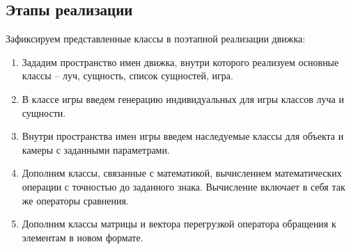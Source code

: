 	\subsection{Этапы реализации}

		Зафиксируем представленные классы в поэтапной реализации движка:
		\begin{enumerate}
			\item Зададим пространство имен движка, внутри которого реализуем основные классы -- луч, сущность, список сущностей, игра.
			\item В классе игры введем генерацию индивидуальных для игры классов луча и сущности.
			\item Внутри пространства имен игры введем наследуемые классы для объекта и камеры с заданными параметрами.
			\item Дополним классы, связанные с математикой, вычислением математических операции с точностью до заданного знака. Вычисление включает в себя так же операторы сравнения.
			\item Дополним классы матрицы и вектора перегрузкой оператора обращения к элементам в новом формате.
		\end{enumerate}
